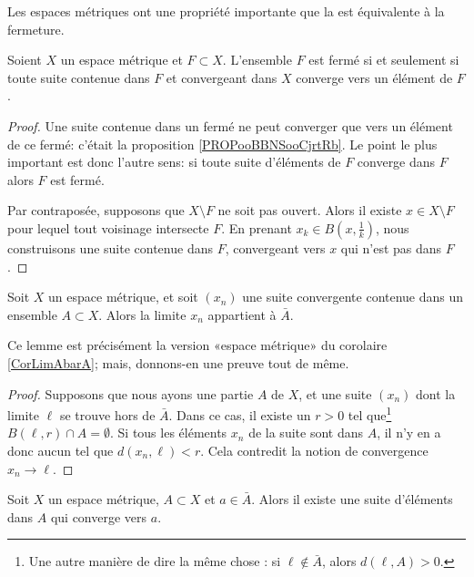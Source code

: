 Les espaces métriques ont une propriété importante que la  est équivalente à la fermeture.
\begin{proposition}    \label{PropLFBXIjt}
	Soient \( X\) un espace métrique et \( F\subset X\). L'ensemble \( F\) est fermé si et seulement si toute suite contenue dans \( F\) et convergeant dans \( X\) converge vers un élément de \( F\).
\end{proposition}

\begin{proof}
	Une suite contenue dans un fermé ne peut converger que vers un élément de ce fermé: c'était la proposition \ref{PROPooBBNSooCjrtRb}. Le point le plus important est donc l'autre sens: si toute suite d'éléments de \( F \) converge dans \( F \) alors \( F \) est fermé.

	Par contraposée, supposons que \( X\setminus F\) ne soit pas ouvert. Alors il existe \( x\in X\setminus F\) pour lequel tout voisinage intersecte \( F\). En prenant \( x_k\in B(x,\frac{1}{ k })\), nous construisons une suite contenue dans \( F\), convergeant vers \( x\) qui n'est pas dans \( F \).
\end{proof}


\begin{lemma}		\label{LemLimAbarA}
	Soit \( X\) un espace métrique, et soit \( (x_n)\) une suite convergente contenue dans un ensemble \( A\subset X\). Alors la limite \( x_n\) appartient à \( \bar A\).
\end{lemma}
Ce lemme est précisément la version «espace métrique» du corolaire \ref{CorLimAbarA}; mais, donnons-en une preuve tout de même.
\begin{proof}
	Supposons que nous ayons une partie \( A\) de \( X\), et une suite \( (x_n)\) dont la limite \( \ell\) se trouve hors de \( \bar A\). Dans ce cas, il existe un \( r>0\) tel que\footnote{Une autre manière de dire la même chose : si \( \ell\notin\bar A\), alors \( d(\ell,A)>0\).} \( B(\ell,r)\cap A=\emptyset\). Si tous les éléments \( x_n\) de la suite sont dans \( A\), il n'y en a donc aucun tel que \( d(x_n,\ell)<r\). Cela contredit la notion de convergence \( x_n\to \ell\).
\end{proof}

\begin{corollary}		\label{CorAdhEstLim}
	Soit \( X\) un espace métrique, \( A \subset X\) et \( a \in \bar A\). Alors il existe une suite d'éléments dans \( A\) qui converge vers \( a\).
\end{corollary}

